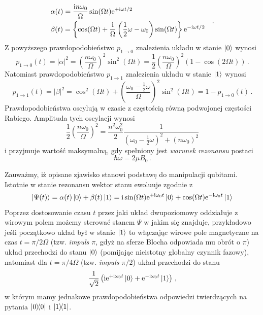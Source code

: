 \documentclass{myclass}
\begin{document}
\begin{equation*}
\begin{split}
    &\alpha(t) = \frac{\mathrm{i} n\omega_0}{\Omega}\sin(\Omega t)\mathrm{e}^{+\mathrm{i}\omega t/2}\\
    &\beta(t) = \left\{\cos(\Omega t) +\frac{\mathrm{i}}{\Omega}\left(\frac{1}{2}\omega - \omega_0\right)\sin(\Omega t)\right\}\mathrm{e}^{-\mathrm{i}\omega t/2}
\end{split}\quad.
\end{equation*}
Z powyższego prawdopodobieństwo \(p_{1\to0}\) znalezienia układu w stanie \(\ket{0}\) wynosi
\begin{equation*}
        p_{1\to0}(t) = |\alpha|^2 = \left(\frac{n\omega_0}{\Omega}\right)^2\sin^2(\Omega t) = \frac{1}{2}\left(\frac{n\omega_0}{\Omega}\right)^2(1-\cos(2\Omega t))\,.
\end{equation*}
Natomiast prawdopodobieństwo \(p_{1\to1}\) znalezienia układu w stanie \(\ket{1}\) wynosi
\begin{equation*}
        p_{1\to1}(t) = |\beta|^2 =\cos^2(\Omega t) + \left(\frac{\omega_0 - \frac{1}{2}\omega}{\Omega}\right)^2\sin^2(\Omega t) = 1 - p_{1\to 0}(t)\,.
\end{equation*}
Prawdopodobieństwa oscylują w czasie z częstością równą podwojonej częstości Rabiego. Amplituda tych
oscylacji wynosi
\begin{equation*}
    \frac{1}{2}\left(\frac{n\omega_0}{\Omega}\right)^2 = \frac{n^2\omega_0^2}{2}\frac{1}{\left(\omega_0 - \frac{1}{2}\omega\right)^2 +
    \left(n\omega_0\right)^2}
\end{equation*}
i przyjmuje wartość maksymalną, gdy spełniony jest \textit{warunek rezonansu} postaci
\begin{equation*}
    \hbar\omega = 2\mu B_0\,.
\end{equation*}

Zauważmy, iż opisane zjawisko stanowi podstawę do manipulacji qubitami. Istotnie w stanie rezonansu
wektor stanu ewoluuje zgodnie z
\begin{equation*}
    \ket{\Psi(t)} = \alpha(t)\ket{0} + \beta(t)\ket{1} = \mathrm{i}\sin(\Omega t)\mathrm{e}^{+\mathrm{i}\omega_0 t}\ket{0} + \cos(\Omega t)\mathrm{e}^{-\mathrm{i}\omega_0 t}\ket{1}
\end{equation*}
Poprzez dostosowanie czasu \(t\) przez jaki układ dwupoziomowy oddziałuje z wirowym polem możemy
sterować stanem \(\Psi\) w jakim się znajduje, przykładowo jeśli początkowo układ był w stanie
\(\ket{1}\) to włączając wirowe pole magnetyczne na czas \(t = \pi/2\Omega\) (tzw. \textit{impuls
\(\pi\)}, gdyż na sferze Blocha odpowiada mu obrót o \(\pi\)) układ przechodzi do stanu \(\ket{0}\)
(pomijając nieistotny globalny czynnik fazowy), natomiast dla \(t = \pi/4\Omega\) (tzw.
\textit{impuls \(\pi/2\)}) układ przechodzi do stanu
\begin{equation*}
    \frac{1}{\sqrt{2}}\left(\mathrm{i}\mathrm{e}^{+\mathrm{i}\omega_0t}\ket{0} + \mathrm{e}^{-\mathrm{i}\omega_0t}\ket{1}\right)\,,
\end{equation*}
w którym mamy jednakowe prawdopodobieństwa odpowiedzi twierdzących na pytania \(\dyad{0}\) i
\(\dyad{1}\).
\end{document}
